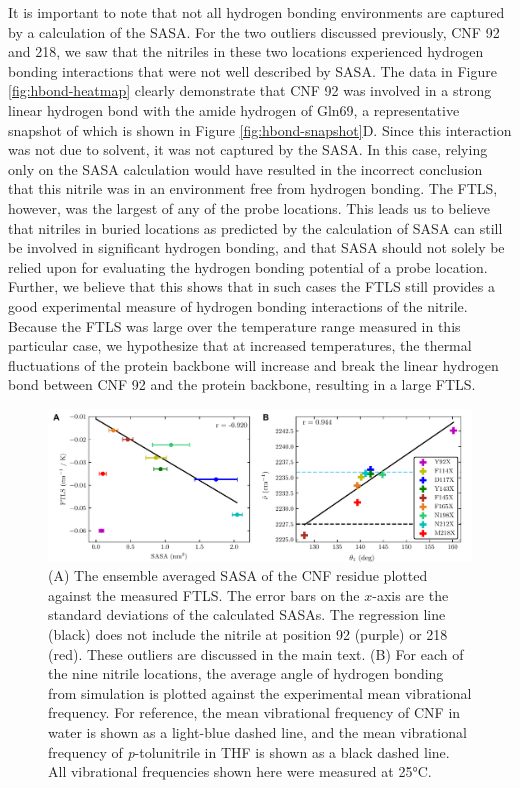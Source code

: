 It is important to note that not all hydrogen bonding environments are captured by a calculation of the SASA.
For the two outliers discussed previously, CNF 92 and 218, we saw that the nitriles in these two locations experienced hydrogen bonding interactions that were not well described by SASA.
The data in Figure \ref{fig:hbond-heatmap} clearly demonstrate that CNF 92 was involved in a strong linear hydrogen bond with the amide hydrogen of Gln69, a representative snapshot of which is shown in Figure \ref{fig:hbond-snapshot}D.
Since this interaction was not due to solvent, it was not captured by the SASA.
In this case, relying only on the SASA calculation would have resulted in the incorrect conclusion that this nitrile was in an environment free from hydrogen bonding.
The FTLS, however, was the largest of any of the probe locations.
This leads us to believe that nitriles in buried locations as predicted by the calculation of SASA can still be involved in significant hydrogen bonding, and that SASA should not solely be relied upon for evaluating the hydrogen bonding potential of a probe location.
Further, we believe that this shows that in such cases the FTLS still provides a good experimental measure of hydrogen bonding interactions of the nitrile.
Because the FTLS was large over the temperature range measured in this particular case, we hypothesize that at increased temperatures, the thermal fluctuations of the protein backbone will increase and break the linear hydrogen bond between CNF 92 and the protein backbone, resulting in a large FTLS. 

\begin{figure}
    \center
    \includegraphics[width=6.5in]{figures-gfp-hbond/Figure8_combined.pdf}
    \caption{(A) The ensemble averaged SASA of the CNF residue plotted against the measured FTLS. The error bars on the $x$-axis are the standard deviations of the calculated SASAs. The regression line (black) does not include the nitrile at position 92 (purple) or 218 (red). These outliers are discussed in the main text. (B) For each of the nine nitrile locations, the average angle of hydrogen bonding from simulation is plotted against the experimental mean vibrational frequency. For reference, the mean vibrational frequency of CNF in water is shown as a light-blue dashed line, and the mean vibrational frequency of \emph{p}-tolunitrile in THF is shown as a black dashed line. All vibrational frequencies shown here were measured at 25\si{\celsius}.}
    \label{fig:hbond-comparison}
\end{figure}


